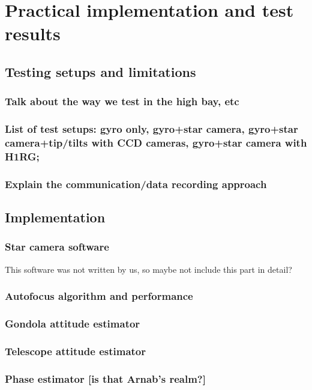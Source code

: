 \section{Practical implementation and test results}


\subsection{Testing setups and limitations}
\subsubsection{Talk about the way we test in the high bay, etc}
\subsubsection{List of test setups: gyro only, gyro+star camera, gyro+star camera+tip/tilts with CCD cameras, gyro+star camera with H1RG;}
\subsubsection{Explain the communication/data recording approach}
\subsection{Implementation}



\subsubsection{Star camera software}
This software was not written by us, so maybe not include this part in detail?
\subsubsection{Autofocus algorithm and performance}
\subsubsection{	Gondola attitude estimator}
\subsubsection{Telescope attitude estimator}
\subsubsection{Phase estimator [is that Arnab’s realm?]}
